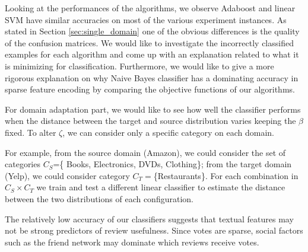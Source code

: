 \documentclass[letterpaper]{article}
\begin{document}
Looking at the performances of the algorithms, we observe Adaboost and
linear SVM have similar accuracies on most of the various experiment
instances. As stated in Section \ref{sec:single_domain} one of the
obvious differences is the quality of the confusion matrices. We would
like to investigate the incorrectly classified examples for each
algorithm and come up with an explanation related to what it is
minimizing for classification.  Furthermore, we would like to give a
more rigorous explanation on why Naive Bayes classifier has a
dominating accuracy in sparse feature encoding by comparing the
objective functions of our algorithms.

For domain adaptation part, we would like to see how well the
classifier performs when the distance between the target and source
distribution varies keeping the $\beta$ fixed. To alter $\zeta$, we
can consider only a specific category on each domain.

For example, from the source domain (Amazon), we could consider the
set of categories $C_S$=\{ Books, Electronics, DVDs, Clothing\};
from the target domain (Yelp), we could consider category
$C_T=$\{Restaurants\}. For each combination in $C_S\times C_T$ we
train and test a different linear classifier to estimate the distance
between the two distributions of each configuration.

The relatively low accuracy of our classifiers suggests that textual features
may not be strong predictors of review usefulness.  Since votes are sparse,
social factors such as the friend network may dominate which reviews receive
votes.  

\small


\end{document}
